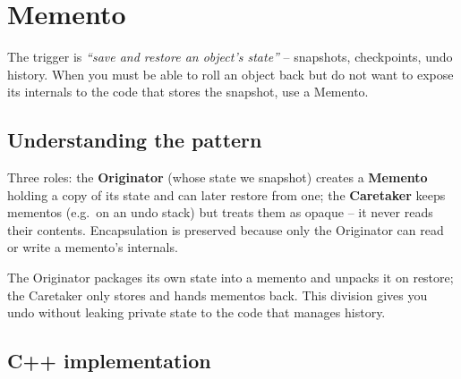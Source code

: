 \section{Memento}
\label{sec:pat-memento}


\begin{patternbox}
The trigger is \emph{``save and restore an object's state''} -- snapshots,
checkpoints, undo history. When you must be able to roll an object back but
do not want to expose its internals to the code that stores the snapshot,
use a Memento.
\end{patternbox}

\subsection*{Understanding the pattern}

Three roles: the \textbf{Originator} (whose state we snapshot) creates a
\textbf{Memento} holding a copy of its state and can later restore from
one; the \textbf{Caretaker} keeps mementos (e.g.\ on an undo stack) but
treats them as opaque -- it never reads their contents. Encapsulation is
preserved because only the Originator can read or write a memento's
internals.

\begin{ideabox}
The Originator packages its own state into a memento and unpacks it on
restore; the Caretaker only stores and hands mementos back. This division
gives you undo without leaking private state to the code that manages
history.
\end{ideabox}

\subsection*{C++ implementation}

